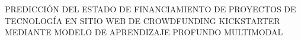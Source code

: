 \begin{center}
	\vspace*{10cm}
	{PREDICCIÓN DEL ESTADO DE FINANCIAMIENTO DE PROYECTOS DE TECNOLOGÍA EN SITIO WEB DE CROWDFUNDING KICKSTARTER MEDIANTE MODELO DE APRENDIZAJE PROFUNDO MULTIMODAL}
\end{center}
